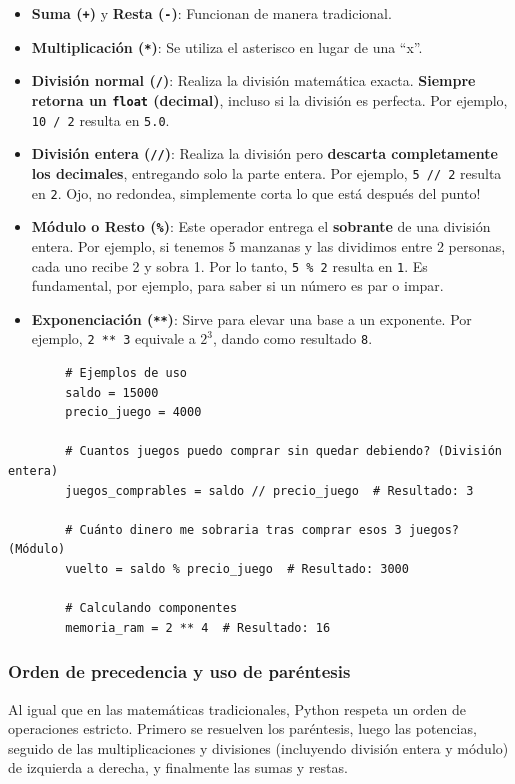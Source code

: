 \documentclass[11pt, a4paper]{article}
\begin{document}
	\begin{itemize}
		\item \textbf{Suma (\texttt{+})} y \textbf{Resta (\texttt{-})}: Funcionan de manera tradicional.
		
		\item \textbf{Multiplicación (\texttt{*})}: Se utiliza el asterisco en lugar de una ``x''.
		
		\item \textbf{División normal (\texttt{/})}: Realiza la división matemática exacta. \textbf{Siempre retorna un \texttt{float} (decimal)}, incluso si la división es perfecta. Por ejemplo, \texttt{10 / 2} resulta en \texttt{5.0}.
		
		\item \textbf{División entera (\texttt{//})}: Realiza la división pero \textbf{descarta completamente los decimales}, entregando solo la parte entera. Por ejemplo, \texttt{5 // 2} resulta en \texttt{2}. Ojo, no redondea, simplemente corta lo que está después del punto!
		
		\item \textbf{Módulo o Resto (\texttt{\%})}: Este operador entrega el \textbf{sobrante} de una división entera. Por ejemplo, si tenemos 5 manzanas y las dividimos entre 2 personas, cada uno recibe 2 y sobra 1. Por lo tanto, \texttt{5 \% 2} resulta en \texttt{1}. Es fundamental, por ejemplo, para saber si un número es par o impar.
		
		\item \textbf{Exponenciación (\texttt{**})}: Sirve para elevar una base a un exponente. Por ejemplo, \texttt{2 ** 3} equivale a $2^3$, dando como resultado \texttt{8}.
	\end{itemize}
	
	\newpage
	
	\begin{lstlisting}
		# Ejemplos de uso
		saldo = 15000
		precio_juego = 4000
		
		# Cuantos juegos puedo comprar sin quedar debiendo? (División entera)
		juegos_comprables = saldo // precio_juego  # Resultado: 3
		
		# Cuánto dinero me sobraria tras comprar esos 3 juegos? (Módulo)
		vuelto = saldo % precio_juego  # Resultado: 3000
		
		# Calculando componentes
		memoria_ram = 2 ** 4  # Resultado: 16
	\end{lstlisting}
	
	\subsubsection*{Orden de precedencia y uso de paréntesis}
	Al igual que en las matemáticas tradicionales, Python respeta un orden de operaciones estricto. Primero se resuelven los paréntesis, luego las potencias, seguido de las multiplicaciones y divisiones (incluyendo división entera y módulo) de izquierda a derecha, y finalmente las sumas y restas.
	
\end{document}

